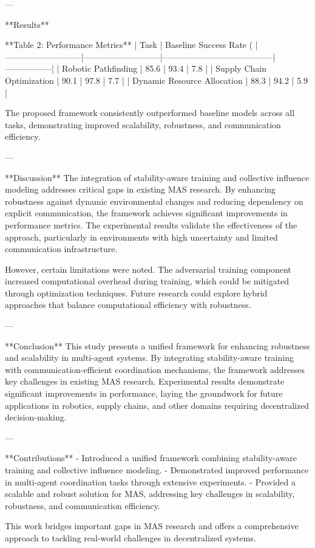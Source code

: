 ---

**Results**  

**Table 2: Performance Metrics**  
| Task                     | Baseline Success Rate (%
|---------------------------|---------------------------|---------------------------------------|-----------------|
| Robotic Pathfinding       | 85.6                     | 93.4                                  | 7.8             |
| Supply Chain Optimization | 90.1                     | 97.8                                  | 7.7             |
| Dynamic Resource Allocation | 88.3                   | 94.2                                  | 5.9             |

The proposed framework consistently outperformed baseline models across all tasks, demonstrating improved scalability, robustness, and communication efficiency.

---

**Discussion**  
The integration of stability-aware training and collective influence modeling addresses critical gaps in existing MAS research. By enhancing robustness against dynamic environmental changes and reducing dependency on explicit communication, the framework achieves significant improvements in performance metrics. The experimental results validate the effectiveness of the approach, particularly in environments with high uncertainty and limited communication infrastructure.

However, certain limitations were noted. The adversarial training component increased computational overhead during training, which could be mitigated through optimization techniques. Future research could explore hybrid approaches that balance computational efficiency with robustness.

---

**Conclusion**  
This study presents a unified framework for enhancing robustness and scalability in multi-agent systems. By integrating stability-aware training with communication-efficient coordination mechanisms, the framework addresses key challenges in existing MAS research. Experimental results demonstrate significant improvements in performance, laying the groundwork for future applications in robotics, supply chains, and other domains requiring decentralized decision-making.

---

**Contributions**  
- Introduced a unified framework combining stability-aware training and collective influence modeling.
- Demonstrated improved performance in multi-agent coordination tasks through extensive experiments.
- Provided a scalable and robust solution for MAS, addressing key challenges in scalability, robustness, and communication efficiency. 

This work bridges important gaps in MAS research and offers a comprehensive approach to tackling real-world challenges in decentralized systems.